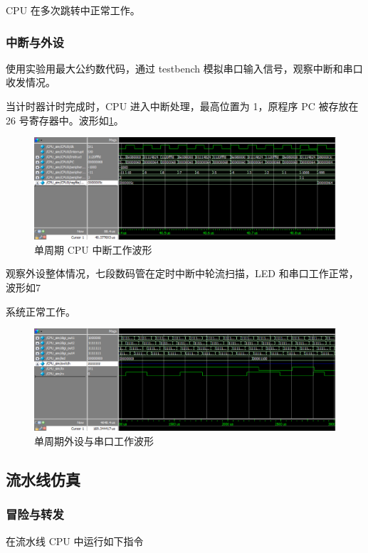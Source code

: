 \documentclass{ctexart}
\begin{document}
	CPU 在多次跳转中正常工作。

	\subsubsection{中断与外设}

	使用实验用最大公约数代码，通过 testbench 模拟串口输入信号，观察中断和串口收发情况。

	当计时器计时完成时，CPU 进入中断处理，最高位置为 1，原程序 PC 被存放在 26 号寄存器中。波形如\ref{simpicture6}。

	\begin{figure}[ht]
		\centering
		\includegraphics[width = \textwidth]{OneCycleTestWave5.eps}
		\caption{单周期 CPU 中断工作波形}
		\label{simpicture6}
	\end{figure}	

	观察外设整体情况，七段数码管在定时中断中轮流扫描，LED 和串口工作正常，波形如7

	系统正常工作。

	\begin{figure}[ht]
		\centering
		\includegraphics[width = \textwidth]{OneCycleTestWave6.eps}
		\caption{单周期外设与串口工作波形}
		\label{simpicture7}
	\end{figure}	

	\subsection{流水线仿真}
	\subsubsection{冒险与转发}
	在流水线 CPU 中运行如下指令
\end{document}
